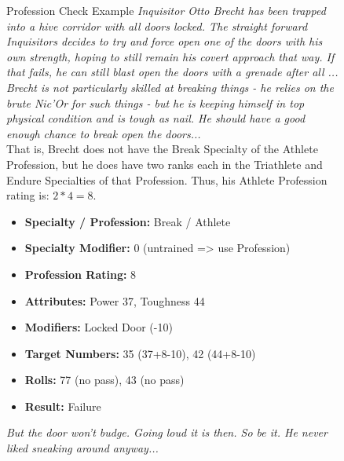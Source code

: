 \begin{figure}[hb]
	\begin{DndSidebar}{Profession Check Example}
	\textit{Inquisitor Otto Brecht has been trapped into a hive corridor with all doors locked. The straight forward Inquisitors decides to try and force open one of the doors with his own strength, hoping to still remain his covert approach that way. If that fails, he can still blast open the doors with a grenade after all ...\\
	\noindent
	Brecht is not particularly skilled at breaking things - he relies on the brute Nic'Or for such things - but he is keeping himself in top physical condition and is tough as nail. He should have a good enough chance to break open the doors...}\\
	\noindent
	That is, Brecht does not have the Break Specialty of the Athlete Profession, but he does have two ranks each in the Triathlete and Endure Specialties of that Profession. Thus, his Athlete Profession rating is: $2*4=8$.
		\begin{itemize}
		\item \textbf{Specialty / Profession:} Break / Athlete
		\item \textbf{Specialty Modifier:} 0 (untrained => use Profession)
		\item \textbf{Profession Rating:} 8
		\item \textbf{Attributes:} Power 37, Toughness 44
		\item \textbf{Modifiers:} Locked Door (-10)
		\item \textbf{Target Numbers:} 35 (37+8-10), 42 (44+8-10)
		\item \textbf{Rolls:} 77 (no pass), 43 (no pass)
		\item \textbf{Result:} Failure
	\end{itemize}
	\textit{But the door won't budge. Going loud it is then. So be it. He never liked sneaking around anyway...}
	\end{DndSidebar}
\end{figure}

